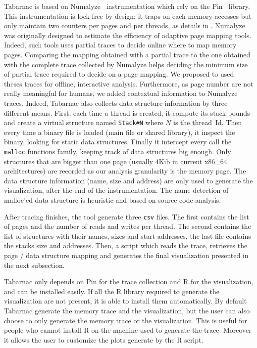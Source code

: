 \gls{Tabarnac} is based on Numalyze~\cite{Diener15Characterizing} instrumentation which rely on the \gls{Pin}~\cite{Luk05Pin} library.
This instrumentation is lock free by design: it traps on each memory accesses but only maintain two counters per pages and per threads, as details in .
Numalyze was originally designed to estimate the efficiency of adaptive page mapping tools.
Indeed, such tools uses partial traces to decide online where to map memory pages.
Comparing the mapping obtained with a partial trace to the one obtained with the complete trace collected by Numalyze helps deciding the minimum size of partial trace required to decide on a page mapping.
We proposed to used theses traces for offline, interactive analysis.
Furthermore, as page number are not really meaningful for humans, we added contextual information to Numalyze traces.
Indeed, \gls{Tabarnac} also collects data structure information by three different means.
First, each time a thread is created, it compute its stack bounds and create a virtual structure named \texttt{Stack\#N} where $N$ is the thread~Id.
Then every time a binary file is loaded (main file or shared library), it inspect the binary, looking for static data structures.
Finally it intercept every call the \texttt{malloc} functions family, keeping track of data structures big enough.
Only structures that are bigger than one page (usually $4$Kib in current x86\_64 architectures) are recorded as our analysis granularity is the memory page. The data structure information (name, size and address) are only used to generate the visualization, after the end of the instrumentation.
The name detection of malloc'ed data structure is heuristic and based on source code analysis.

After tracing finishes, the tool generate three \texttt{csv} files.
The first contains the list of pages and the number of reads and writes per thread.
The second contains the list of structures with their names, sizes and start addresses, the last file contains the stacks size and addresses.
Then, a script which reads the trace, retrieves the page / data structure mapping and generates the final visualization presented in the next subsection.

\gls{Tabarnac} only depends on \gls{Pin} for the trace collection and \gls{R} for the visualization, and can be installed easily.
If all the R library required to generate the visualization are not present, it is able to install them automatically.
By default \gls{Tabarnac} generate the memory trace and the visualization, but the user can also choose to only generate the memory trace or the visualization.
This is useful for people who cannot install \gls{R} on the machine used to generate the trace.
Moreover it allows the user to customize the plots generate by the \gls{R} script.

